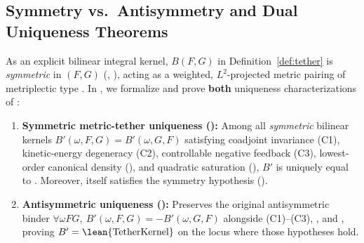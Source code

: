 \documentclass[11pt,a4paper]{article}
\theoremstyle{plain}
\theoremstyle{definition}
\theoremstyle{remark}
\begin{document}
\subsection{Symmetry vs.\ Antisymmetry and Dual Uniqueness Theorems}
As an explicit bilinear integral kernel, $B(F,G)$ in Definition~\ref{def:tether} is \emph{symmetric} in $(F,G)$ (, ), acting as a weighted, $L^2$-projected metric pairing of metriplectic type \cite{Morrison1986}. In , we formalize and prove \textbf{both} uniqueness characterizations of :
\begin{enumerate}
\item \textbf{Symmetric metric-tether uniqueness ():} Among all \emph{symmetric} bilinear kernels $B'(\omega,F,G)=B'(\omega,G,F)$ satisfying coadjoint invariance (C1), kinetic-energy degeneracy (C2), controllable negative feedback (C3), lowest-order canonical density (), and quadratic saturation (), $B'$ is uniquely equal to . Moreover,  itself satisfies the symmetry hypothesis ().
\item \textbf{Antisymmetric uniqueness ():} Preserves the original antisymmetric binder $\forall\omega F G,\ B'(\omega,F,G)=-B'(\omega,G,F)$ alongside (C1)--(C3), , and , proving $B'=\text{\lean{TetherKernel}}$ on the locus where those hypotheses hold.
\end{enumerate}
\end{document}
